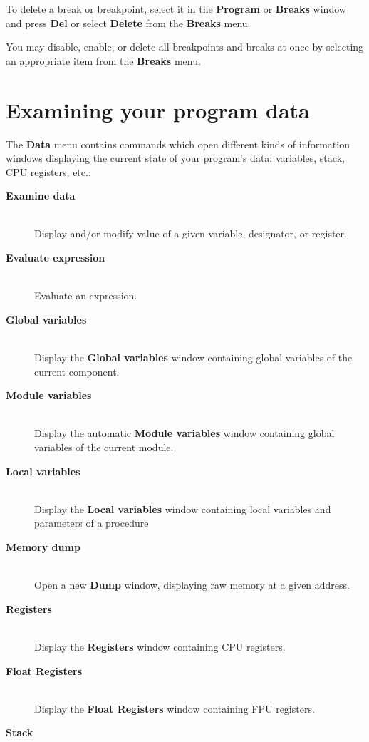 To delete a break or breakpoint, select it in the {\bf Program}
or {\bf Breaks} window and press {\bf Del} or select {\bf Delete}
from the {\bf Breaks} menu.

You may disable, enable, or delete all breakpoints and breaks at once
by selecting an appropriate item from the {\bf Breaks} menu.

\section{Examining your program data}
\label{dialog:data}

The {\bf Data} menu contains commands which open different kinds
of information windows displaying the current state of your program's data:
variables, stack, CPU registers, etc.:

\begin{description}
\item[{\bf Examine data}] \mbox{} \\
    Display and/or modify value of a given variable, designator, or register.
\item[{\bf Evaluate expression}] \mbox{} \\
    Evaluate an expression.
\item[{\bf Global variables}] \mbox{} \\
    Display the {\bf Global variables} window containing global variables of 
    the current component.
\item[{\bf Module variables}] \mbox{} \\
    Display the automatic {\bf Module variables} window containing 
    global variables of the current module.
\item[{\bf Local variables}] \mbox{} \\
    Display the {\bf Local variables} window containing local variables
    and parameters of a procedure 
\item[{\bf Memory dump}] \mbox{} \\
    Open a new {\bf Dump} window, displaying raw memory at a given
    address.
\item[{\bf Registers}] \mbox{} \\
    Display the {\bf Registers} window containing CPU registers.
\item[{\bf Float Registers}] \mbox{} \\
    Display the {\bf Float Registers} window containing FPU registers.
\item[{\bf Stack}] \mbox{} \\

\end{description}
